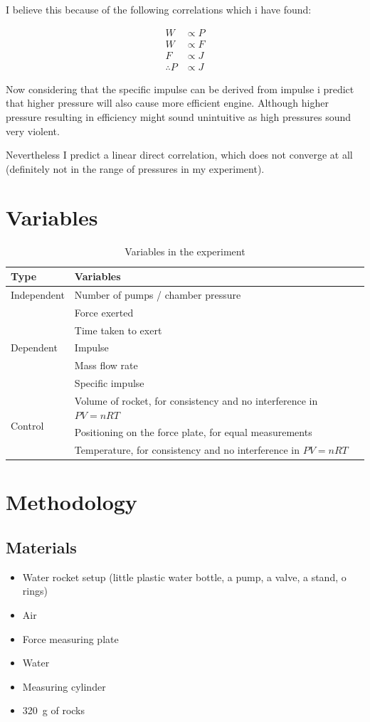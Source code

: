 \documentclass[12pt,a4paper]{article}
\begin{document}
I believe this because of the following correlations which i have found:

\begin{align}
W &\propto P \\
W &\propto F \\
F &\propto J \\
\therefore P &\propto J
\end{align}

Now considering that the specific impulse can be derived from impulse i predict that higher pressure will also cause more efficient engine. Although higher pressure resulting in efficiency might sound unintuitive as high pressures sound very violent.

Nevertheless I predict a linear direct correlation, which does not converge at all (definitely not in the range of pressures in my experiment).

\section{Variables}

\begin{table}[H]
\centering
\caption{Variables in the experiment}
\begin{tabular}{@{}lp{10cm}@{}}
\toprule
\textbf{Type} & \textbf{Variables} \\
\midrule
Independent & Number of pumps / chamber pressure \\
\midrule
\multirow{5}{*}{Dependent} & Force exerted \\
& Time taken to exert \\
& Impulse \\
& Mass flow rate \\
& Specific impulse \\
\midrule
\multirow{3}{*}{Control} & Volume of rocket, for consistency and no interference in $PV=nRT$ \\
& Positioning on the force plate, for equal measurements \\
& Temperature, for consistency and no interference in $PV=nRT$ \\
\bottomrule
\end{tabular}
\end{table}

\section{Methodology}

\subsection{Materials}
\begin{itemize}
\item Water rocket setup (little plastic water bottle, a pump, a valve, a stand, o rings)
\item Air
\item Force measuring plate
\item Water
\item Measuring cylinder
\item \SI{320}{\gram} of rocks
\end{itemize}
\end{document}
